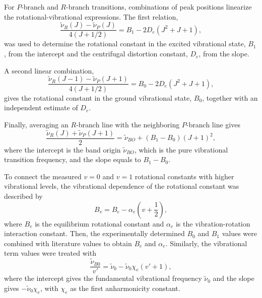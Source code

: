 \documentclass[12pt]{article}
\begin{document}
For \(P\)-branch and \(R\)-branch transitions, combinations of peak positions linearize the rotational-vibrational expressions. The first relation,\cite{lab_manual}
\begin{equation}
\frac{\tilde{\nu}_R(J)-\tilde{\nu}_P(J)}{4(J+1/2)}
=
B_1-2D_e\left(J^2+J+1\right),
\end{equation}
was used to determine the rotational constant in the excited vibrational state, \(B_1\), from the intercept and the centrifugal distortion constant, \(D_e\), from the slope. 

A second linear combination,\cite{lab_manual}
\begin{equation}
\frac{\tilde{\nu}_R(J-1)-\tilde{\nu}_P(J+1)}{4(J+1/2)}
=
B_0-2D_e\left(J^2+J+1\right),
\end{equation}
gives the rotational constant in the ground vibrational state, \(B_0\), together with an independent estimate of \(D_e\). 

Finally, averaging an \(R\)-branch line with the neighboring \(P\)-branch line gives\cite{lab_manual}
\begin{equation}
\frac{\tilde{\nu}_R(J)+\tilde{\nu}_P(J+1)}{2}
=
\tilde{\nu}_{BO}+(B_1-B_0)(J+1)^2,
\end{equation}
where the intercept is the band origin \(\tilde{\nu}_{BO}\), which is the pure vibrational transition frequency, and the slope equals to \(B_1-B_0\). \cite{lab_manual}

To connect the measured \(v=0\) and \(v=1\) rotational constants with higher vibrational levels, the vibrational dependence of the rotational constant was described by \cite{lab_manual}
\begin{equation}
B_v = B_e-\alpha_e\left(v+\frac{1}{2}\right),
\end{equation}
where \(B_e\) is the equilibrium rotational constant and \(\alpha_e\) is the vibration-rotation interaction constant. Then, the experimentally determined \(B_0\) and \(B_1\) values were combined with literature values \cite{sime1990lit_all} to obtain \(B_e\) and \(\alpha_e\). Similarly, the vibrational term values were treated with\cite{lab_manual}
\begin{equation}
\frac{\tilde{\nu}_{B0}}{v'}
=
\tilde{\nu}_0-\tilde{\nu}_0\chi_e(v'+1),
\end{equation}
where the intercept gives the fundamental vibrational frequency \(\tilde{\nu}_0\) and the slope gives \(-\tilde{\nu}_0\chi_e\), with \(\chi_e\) as the first anharmonicity constant. 
\end{document}
